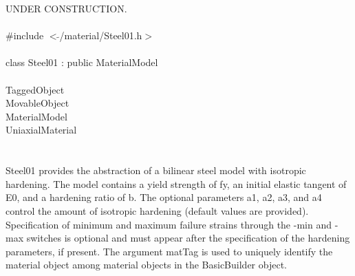 
UNDER CONSTRUCTION. \\

   \\
\indent \#include $<\tilde{ }$/material/Steel01.h$>$  \\

  \\
\indent class Steel01 : public MaterialModel \\

 \\
\indent TaggedObject \\
\indent MovableObject \\
\indent\indent MaterialModel \\
\indent\indent\indent UniaxialMaterial \\
\indent\indent\indent{} \\

  \\
\indent Steel01 provides the abstraction of a bilinear steel model
with isotropic hardening. The model contains a yield strength of fy,
an initial elastic tangent of E0, and a hardening ratio of b. The
optional parameters a1, a2, a3, and a4 control the amount of isotropic
hardening (default values are provided). Specification of minimum and
maximum failure strains through the -min and -max switches is optional
and must appear after the specification of the hardening parameters,
if present. The argument matTag is used to uniquely identify the
material object among material objects in the BasicBuilder object. 


